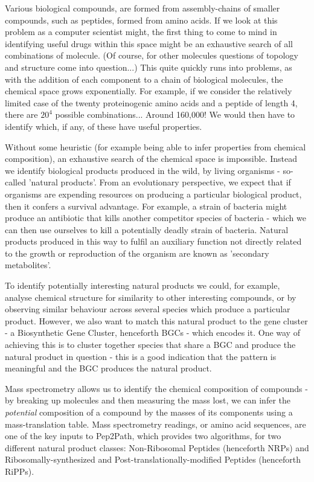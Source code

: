 \documentclass{l4proj}
\begin{document}
Various biological compounds, are formed from assembly-chains of smaller compounds, such as peptides, formed from amino acids.
If we look at this problem as a computer scientist might, the first thing to come to mind in identifying useful drugs within this space might be an exhaustive search of all combinations of molecule.
(Of course, for other molecules questions of topology and structure come into question...)
This quite quickly runs into problems, as with the addition of each component to a chain of biological molecules, the chemical space grows exponentially.
For example, if we consider the relatively limited case of the twenty proteinogenic amino acids and a peptide of length 4, there are \(20^4\) possible combinations... Around 160,000! We would then have to identify which, if any, of these have useful properties.

Without some heuristic (for example being able to infer properties from chemical composition), an exhaustive search of the chemical space is impossible.
Instead we identify biological products produced in the wild, by living organisms - so-called 'natural products'.
From an evolutionary perspective, we expect that if organisms are expending resources on producing a particular biological product, then it confers a survival advantage.
For example, a strain of bacteria might produce an antibiotic that kills another competitor species of bacteria - which we can then use ourselves to kill a potentially deadly strain of bacteria.
Natural products produced in this way to fulfil an auxiliary function not directly related to the growth or reproduction of the organism are known as 'secondary metabolites'.

To identify potentially interesting natural products we could, for example, analyse chemical structure for similarity to other interesting compounds, or by observing similar behaviour across several species which produce a particular product. 
However, we also want to match this natural product to the gene cluster - a Biosynthetic Gene Cluster, henceforth BGCs - which encodes it.
One way of achieving this is to cluster together species that share a BGC and produce the natural product in question - this is a good indication that the pattern is meaningful and the BGC produces the natural product.

Mass spectrometry allows us to identify the chemical composition of compounds - by breaking up molecules and then measuring the mass lost, we can infer the \textit{potential} composition of a compound by the masses of its components using a mass-translation table. Mass spectrometry readings, or amino acid sequences, are one of the key inputs to Pep2Path, which provides two algorithms, for two different natural product classes: Non-Ribosomal Peptides (henceforth NRPs) and Ribosomally-synthesized and Post-translationally-modified Peptides (henceforth RiPPs). 
\end{document}
